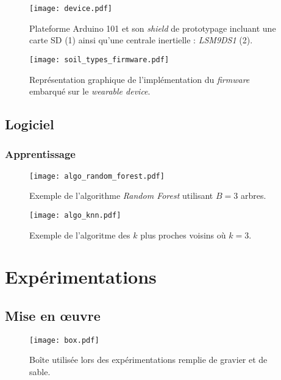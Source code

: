 \begin{figure}[H]
	\centering
	\texttt{[image: device.pdf]}
        \caption{Plateforme Arduino 101 et son \textit{shield} de prototypage incluant une carte SD (1) ainsi qu'une centrale inertielle : \textit{LSM9DS1} (2).}
	\label{fig:device}
\end{figure}


\begin{figure}[H]
	\centering
	\texttt{[image: soil\_types\_firmware.pdf]}
        \caption{Représentation graphique de l'implémentation du \textit{firmware} embarqué sur le \textit{wearable device}.}
	\label{fig:soil_types_firmware}
\end{figure}

\subsection{Logiciel}

\subsubsection{Apprentissage}

\begin{figure}[H]
	\centering
	\texttt{[image: algo\_random\_forest.pdf]}
        \caption{Exemple de l'algorithme \textit{Random Forest} utilisant $B=3$ arbres.}
	\label{fig:algo_random_forest}
\end{figure}

\begin{figure}[H]
	\centering
	\texttt{[image: algo\_knn.pdf]}
        \caption{Exemple de l'algoritme des $k$ plus proches voisins où $k=3$.}
	\label{fig:algo_knn}
\end{figure}

\section{Expérimentations}

\subsection{Mise en \oe{}uvre}

\begin{figure}[H]
	\centering
	\texttt{[image: box.pdf]}
        \caption{Boîte utilisée lors des expérimentations remplie de gravier et de sable.}
	\label{fig:box}
\end{figure}

